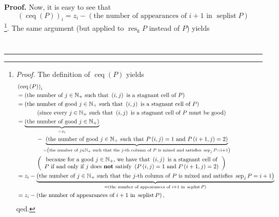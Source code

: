 \documentclass[numbers=enddot,12pt,final,onecolumn,notitlepage]{scrartcl}%
\theoremstyle{definition}
\newenvironment{proof}[1][Proof]{\noindent\textbf{#1.} }{\ \rule{0.5em}{0.5em}}
\begin{document}
\begin{proof}
Now, it is easy to see that%
\[
\left(  \operatorname*{ceq}\left(  P\right)  \right)  _{i}=z_{i}-\left(
\text{the number of appearances of }i+1\text{ in }\operatorname*{seplist}%
P\right)
\]
\footnote{\textit{Proof.} The definition of $\operatorname*{ceq}\left(
P\right)  $ yields%
\begin{align*}
&  \left(  \operatorname*{ceq}\left(  P\right)  \right)  _{i}\\
&  =\left(  \text{the number of }j\in\mathbb{N}_{+}\text{ such that }\left(
i,j\right)  \text{ is a stagnant cell of }P\right) \\
&  =\left(  \text{the number of good }j\in\mathbb{N}_{+}\text{ such that
}\left(  i,j\right)  \text{ is a stagnant cell of }P\right) \\
&  \ \ \ \ \ \ \ \ \ \ \left(  \text{since every }j\in\mathbb{N}_{+}\text{
such that }\left(  i,j\right)  \text{ is a stagnant cell of }P\text{ must be
good}\right) \\
&  =\underbrace{\left(  \text{the number of good }j\in\mathbb{N}_{+}\right)
}_{=z_{i}}\\
&  \ \ \ \ \ \ \ \ \ \ -\underbrace{\left(  \text{the number of good }%
j\in\mathbb{N}_{+}\text{ such that }P\left(  i,j\right)  =1\text{ and
}P\left(  i+1,j\right)  =2\right)  }_{=\left(  \text{the number of }%
j\in\mathbb{N}_{+}\text{ such that the }j\text{-th column of }P\text{ is mixed
and satisfies }\operatorname*{sep}\nolimits_{j}P=i+1\right)  }\\
&  \ \ \ \ \ \ \ \ \ \ \left(
\begin{array}
[c]{c}%
\text{because for a good }j\in\mathbb{N}_{+}\text{, we have that }\left(
i,j\right)  \text{ is a stagnant cell of}\\
P\text{ if and only if }j\text{ does \textbf{not} satisfy }\left(  P\left(
i,j\right)  =1\text{ and }P\left(  i+1,j\right)  =2\right)
\end{array}
\right) \\
&  =z_{i}-\underbrace{\left(  \text{the number of }j\in\mathbb{N}_{+}\text{
such that the }j\text{-th column of }P\text{ is mixed and satisfies
}\operatorname*{sep}\nolimits_{j}P=i+1\right)  }_{=\left(  \text{the number of
appearances of }i+1\text{ in }\operatorname*{seplist}P\right)  }\\
&  =z_{i}-\left(  \text{the number of appearances of }i+1\text{ in
}\operatorname*{seplist}P\right)  ,
\end{align*}
qed.}. The same argument (but applied to $\operatorname*{res}\nolimits_{k}P$
instead of $P$) yields%
\begin{align*}

\end{align*}
\end{proof}
\end{document}
